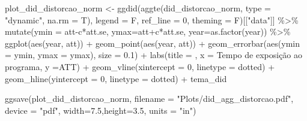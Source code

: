 \documentclass[
  letterpaper,
  DIV=11,
  numbers=noendperiod]{scrartcl}
\newenvironment{Shaded}{\begin{snugshade}}{\end{snugshade}}
\newcommand{\AttributeTok}[1]{\textcolor[rgb]{0.40,0.45,0.13}{#1}}
\newcommand{\DecValTok}[1]{\textcolor[rgb]{0.68,0.00,0.00}{#1}}
\newcommand{\FloatTok}[1]{\textcolor[rgb]{0.68,0.00,0.00}{#1}}
\newcommand{\FunctionTok}[1]{\textcolor[rgb]{0.28,0.35,0.67}{#1}}
\newcommand{\NormalTok}[1]{\textcolor[rgb]{0.00,0.23,0.31}{#1}}
\newcommand{\OtherTok}[1]{\textcolor[rgb]{0.00,0.23,0.31}{#1}}
\newcommand{\SpecialCharTok}[1]{\textcolor[rgb]{0.37,0.37,0.37}{#1}}
\newcommand{\StringTok}[1]{\textcolor[rgb]{0.13,0.47,0.30}{#1}}
\begin{document}
\begin{Shaded}
\begin{Highlighting}[]
\NormalTok{plot\_did\_distorcao\_norm }\OtherTok{\textless{}{-}}
\FunctionTok{ggdid}\NormalTok{(}\FunctionTok{aggte}\NormalTok{(did\_distorcao\_norm, }\AttributeTok{type =} \StringTok{"dynamic"}\NormalTok{, }\AttributeTok{na.rm =}\NormalTok{ T),       }
      \AttributeTok{legend =}\NormalTok{ F, }\AttributeTok{ref\_line =} \DecValTok{0}\NormalTok{, }\AttributeTok{theming =}\NormalTok{ F)[[}\StringTok{"data"}\NormalTok{]] }\SpecialCharTok{\%\textgreater{}\%} 
    \FunctionTok{mutate}\NormalTok{(}\AttributeTok{ymin =}\NormalTok{ att}\SpecialCharTok{{-}}\NormalTok{c}\SpecialCharTok{*}\NormalTok{att.se, }\AttributeTok{ymax=}\NormalTok{att}\SpecialCharTok{+}\NormalTok{c}\SpecialCharTok{*}\NormalTok{att.se, }\AttributeTok{year=}\FunctionTok{as.factor}\NormalTok{(year)) }\SpecialCharTok{\%\textgreater{}\%} 
    \FunctionTok{ggplot}\NormalTok{(}\FunctionTok{aes}\NormalTok{(year, att)) }\SpecialCharTok{+}
    \FunctionTok{geom\_point}\NormalTok{(}\FunctionTok{aes}\NormalTok{(year, att)) }\SpecialCharTok{+}
    \FunctionTok{geom\_errorbar}\NormalTok{(}\FunctionTok{aes}\NormalTok{(}\AttributeTok{ymin =}\NormalTok{ ymin, }\AttributeTok{ymax =}\NormalTok{ ymax), }\AttributeTok{size =} \FloatTok{0.1}\NormalTok{) }\SpecialCharTok{+}
    \FunctionTok{labs}\NormalTok{(}\AttributeTok{title =} \StringTok{\textquotesingle{}\textquotesingle{}}\NormalTok{,}
         \AttributeTok{x =} \StringTok{\textquotesingle{}Tempo de exposição ao programa\textquotesingle{}}\NormalTok{,}
         \AttributeTok{y =}\StringTok{\textquotesingle{}ATT\textquotesingle{}}\NormalTok{) }\SpecialCharTok{+}
    \FunctionTok{geom\_vline}\NormalTok{(}\AttributeTok{xintercept =} \StringTok{\textquotesingle{}0\textquotesingle{}}\NormalTok{, }\AttributeTok{linetype =} \StringTok{\textquotesingle{}dotted\textquotesingle{}}\NormalTok{) }\SpecialCharTok{+}
    \FunctionTok{geom\_hline}\NormalTok{(}\AttributeTok{yintercept =} \DecValTok{0}\NormalTok{, }\AttributeTok{linetype =} \StringTok{\textquotesingle{}dotted\textquotesingle{}}\NormalTok{) }\SpecialCharTok{+}
\NormalTok{    tema\_did}

\FunctionTok{ggsave}\NormalTok{(plot\_did\_distorcao\_norm, }
       \AttributeTok{filename =} \StringTok{"Plots/did\_agg\_distorcao.pdf"}\NormalTok{,}
       \AttributeTok{device =} \StringTok{"pdf"}\NormalTok{,}
       \AttributeTok{width=}\FloatTok{7.5}\NormalTok{,}\AttributeTok{height=}\FloatTok{3.5}\NormalTok{, }\AttributeTok{units =} \StringTok{"in"}\NormalTok{)}


\end{Highlighting}
\end{Shaded}
\end{document}
